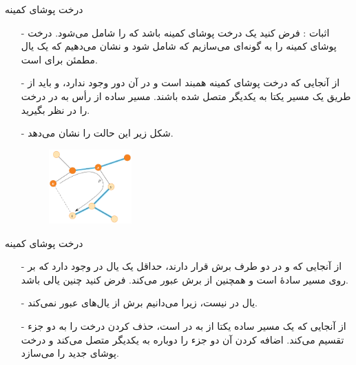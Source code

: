 \iffalse
\begin{frame}{‌درخت پوشای کمینه}
\begin{itemize}\itemr
\item[-]
اثبات : فرض کنید
یک درخت پوشای کمینه باشد که
را شامل می‌شود. درخت پوشای کمینه
را به گونه‌ای می‌سازیم که شامل
شود و نشان می‌دهیم که
یک یال مطمئن برای
است.
\item[-]
از آنجایی که 
درخت پوشای کمینه همبند است و در آن دور وجود ندارد، 
و
باید از طریق یک مسیر یکتا به یکدیگر متصل شده باشند.
 مسیر ساده
از رأس
به
در درخت
را در نظر بگیرید.
\item[-]
شکل زیر این حالت را نشان می‌دهد.
\begin{figure}
\includegraphics[width=0.3\textwidth]{figs/chap07/589-proof}
\end{figure}
\end{itemize}
\end{frame}


\begin{frame}{‌درخت پوشای کمینه}
\begin{itemize}\itemr
\item[-]
از آنجایی که
و
در دو طرف برش
قرار دارند، حداقل یک یال در
وجود دارد که بر روی مسیر سادهٔ
است و همچنین از برش عبور می‌کند. فرض کنید
چنین یالی باشد.
\item[-]
یال
در
نیست، زیرا می‌دانیم برش از یال‌های
عبور نمی‌کند.
\item[-]
از آنجایی که
یک مسیر ساده یکتا از
به
در
است، حذف کردن
درخت
را به دو جزء تقسیم می‌کند. اضافه کردن
آن دو جزء را دوباره به یکدیگر متصل می‌کند و درخت پوشای جدید
را می‌سازد.
\end{itemize}
\end{frame}


